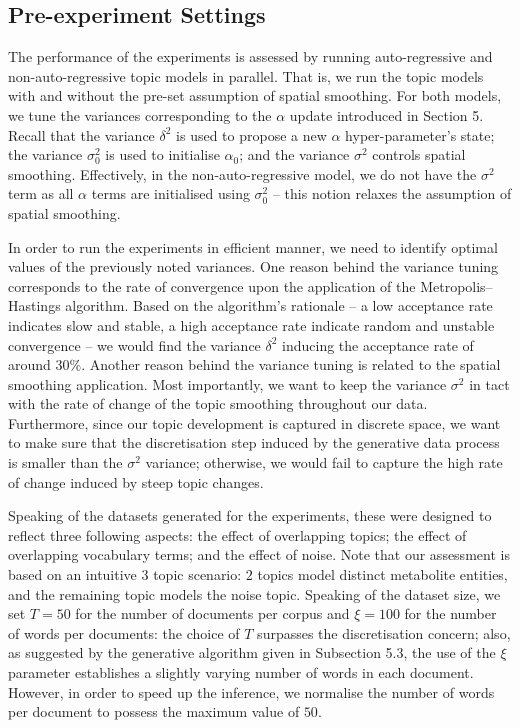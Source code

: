 \documentclass{mpaper}
\begin{document}
\subsection{Pre-experiment Settings}

\par The performance of the experiments is assessed by running auto-regressive and non-auto-regressive topic models in parallel. That is, we run the topic models with and without the pre-set assumption of spatial smoothing. For both models, we tune the variances corresponding to the $\alpha$ update introduced in Section 5. Recall that the variance $\delta^2$ is used to propose a new $\alpha$ hyper-parameter's state; the variance $\sigma_0^2$ is used to initialise $\alpha_0$; and the variance $\sigma^2$ controls spatial smoothing. Effectively, in the non-auto-regressive model, we do not have the $\sigma^2$ term as all $\alpha$ terms are initialised using $\sigma_0^2$ -- this notion relaxes the assumption of spatial smoothing.

\par In order to run the experiments in efficient manner, we need to identify optimal values of the previously noted variances. One reason behind the variance tuning corresponds to the rate of convergence upon the application of the Metropolis--Hastings algorithm. Based on the algorithm's rationale -- a low acceptance rate indicates slow and stable, a high acceptance rate indicate random and unstable convergence -- we would find the variance $\delta^2$ inducing the acceptance rate of around $30\%$. Another reason behind the variance tuning is related to the spatial smoothing application. Most importantly, we want to keep the variance $\sigma^2$ in tact with the rate of change of the topic smoothing throughout our data. Furthermore, since our topic development is captured in discrete space, we want to make sure that the discretisation step induced by the generative data process is smaller than the $\sigma^2$ variance; otherwise, we would fail to capture the high rate of change induced by steep topic changes.
\par Speaking of the datasets generated for the experiments, these were designed to reflect three following aspects: the effect of overlapping topics; the effect of overlapping vocabulary terms; and the effect of noise. Note that our assessment is based on an intuitive $3$ topic scenario: $2$ topics model distinct metabolite entities, and the remaining topic models the noise topic. Speaking of the dataset size, we set $T=50$ for the number of documents per corpus and $\xi=100$ for the number of words per documents: the choice of $T$ surpasses the discretisation concern; also, as suggested by the generative algorithm given in Subsection 5.3, the use of the $\xi$ parameter establishes a slightly varying number of words in each document. However, in order to speed up the inference, we normalise the number of words per document to possess the maximum value of $50$.
\end{document}
